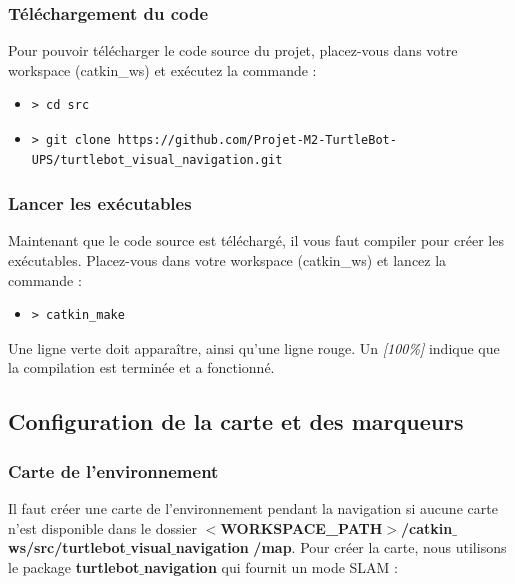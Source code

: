 \documentclass[10pt,a4paper]{article}
\begin{document}
\subsubsection{Téléchargement du code}
\label{sec:TelechargementCode}
Pour pouvoir télécharger le code source du projet, placez-vous dans votre workspace (catkin\_ws) et exécutez la commande :

\begin{itemize}
\item[]  \begin{verbatim}> cd src \end{verbatim}
\item[]  \begin{verbatim}> git clone https://github.com/Projet-M2-TurtleBot-UPS/turtlebot_visual_navigation.git \end{verbatim}
\end{itemize}

\subsubsection{Lancer les exécutables}

Maintenant que le code source est téléchargé, il vous faut compiler pour créer les exécutables. Placez-vous dans votre workspace (catkin\_ws) et lancez la commande :

\begin{itemize}
\item[]  \begin{verbatim}> catkin_make \end{verbatim}
\end{itemize}

Une ligne verte doit apparaître, ainsi qu'une ligne rouge.
Un \upshape \emph{[100\%]} indique que la compilation est terminée et a fonctionné. 

\subsection{Configuration de la carte et des marqueurs}
\label{sec:mapAndMarkersConfig}

\subsubsection{Carte de l'environnement}

Il faut créer une carte de l'environnement pendant la navigation si aucune carte n'est disponible dans le dossier \textbf{$<$WORKSPACE\_PATH$>$/catkin$\_$ws/src/turtlebot$\_$visual$\_$navigation} \textbf{/map}. Pour créer la carte, nous utilisons le package \textbf{turtlebot$\_$navigation} qui fournit un mode SLAM :
\end{document}
